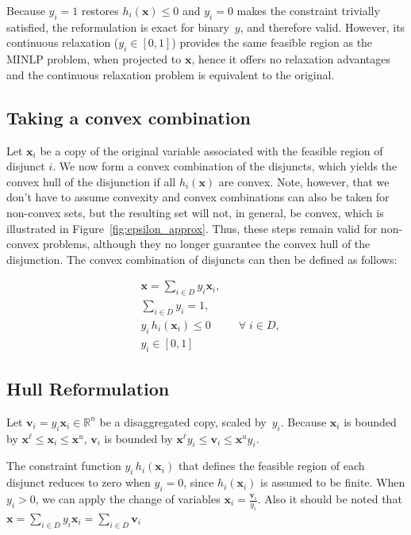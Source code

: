 \documentclass[11pt]{article}
\begin{document}
\begin{appendices}
Because $y_i=1$ restores $h_i(\mathbf x)\le 0$ and $y_i=0$  makes the constraint trivially satisfied, the reformulation is exact for binary~$y$, and therefore valid.
However, its continuous relaxation ($y_i\in[0,1]$) provides the same feasible region as the MINLP problem,  when projected to $\mathbf{x}$, hence it offers no relaxation advantages and the continuous relaxation problem is equivalent to the original.
\subsection{Taking a convex combination}
Let $\mathbf x_i$ be a copy of the original variable associated with the feasible region of disjunct $i$. We now form a convex combination of the disjuncts, which yields the convex hull of the disjunction if all $h_i(\mathbf x)$ are convex.
Note, however, that we don't have to assume convexity and convex combinations can also be taken for non-convex sets, but the resulting set will not, in general, be convex, which is illustrated in Figure~\ref{fig:epsilon_approx}.
Thus, these steps remain valid for non-convex problems, although they no longer guarantee the convex hull of the disjunction.
The convex combination of disjuncts can then be defined as follows:

\begingroup
\begin{equation*}
\begin{aligned}
& \mathbf{x} = \sum_{i \in D}y_i\mathbf{x}_i, \\
& \sum_{i \in D}y_i = 1, \\
& y_i\,h_i(\mathbf x_i) \le 0 &&\forall\; i\in D,\\
& y_i\in[0,1]
\end{aligned}
\end{equation*}
\endgroup









\subsection{Hull Reformulation}

Let  $\mathbf v_i=y_i\mathbf x_i\in\mathbb R^n$ be a disaggregated copy, scaled by~$y_i$. Because $\mathbf x_i$ is bounded by $\mathbf x^{\ell}\le \mathbf x_i\le \mathbf x^{u}$, $\mathbf v_i$ is bounded by $\mathbf x^{\ell}y_i\le \mathbf v_i\le \mathbf x^{u}y_i$.

The constraint function \( y_i\, h_i(\mathbf{x}_i) \) that defines the feasible region of each disjunct reduces to zero when \( y_i = 0 \), since \( h_i(\mathbf{x}_i) \) is assumed to be finite. When \( y_i > 0 \), we can apply the change of variables \( \mathbf{x}_i = \frac{\mathbf{v}_i}{y_i} \). Also it should be noted that $ \mathbf{x} = \sum_{i \in D}y_i\mathbf{x}_i = \sum_{i \in D}\mathbf{v}_i$


\end{appendices}
\end{document}
